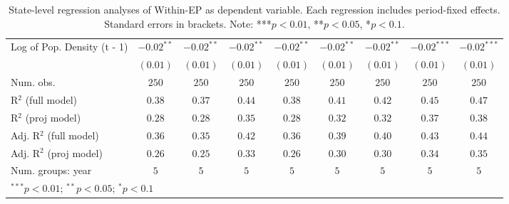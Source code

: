 \begin{table}
\begin{center}
\begin{tabular}{l c c c c c c c c}
Log of Pop. Density (t - 1)       & $-0.02^{**}$ & $-0.02^{**}$ & $-0.02^{**}$ & $-0.02^{**}$ & $-0.02^{**}$ & $-0.02^{**}$ & $-0.02^{***}$ & $-0.02^{***}$ \\
                                  & $(0.01)$     & $(0.01)$     & $(0.01)$     & $(0.01)$     & $(0.01)$     & $(0.01)$     & $(0.01)$      & $(0.01)$      \\
\hline
Num. obs.                         & $250$        & $250$        & $250$        & $250$        & $250$        & $250$        & $250$         & $250$         \\
R$^2$ (full model)                & $0.38$       & $0.37$       & $0.44$       & $0.38$       & $0.41$       & $0.42$       & $0.45$        & $0.47$        \\
R$^2$ (proj model)                & $0.28$       & $0.28$       & $0.35$       & $0.28$       & $0.32$       & $0.32$       & $0.37$        & $0.38$        \\
Adj. R$^2$ (full model)           & $0.36$       & $0.35$       & $0.42$       & $0.36$       & $0.39$       & $0.40$       & $0.43$        & $0.44$        \\
Adj. R$^2$ (proj model)           & $0.26$       & $0.25$       & $0.33$       & $0.26$       & $0.30$       & $0.30$       & $0.34$        & $0.35$        \\
Num. groups: year                 & $5$          & $5$          & $5$          & $5$          & $5$          & $5$          & $5$           & $5$           \\
\hline
\multicolumn{9}{l}{\scriptsize{$^{***}p<0.01$; $^{**}p<0.05$; $^{*}p<0.1$}}
\end{tabular}
\caption{State-level regression analyses of Within-EP as dependent variable. Each regression includes period-fixed effects. Standard errors in brackets. Note: ***$p<0.01$, **$p<0.05$, *$p<0.1$.}
\label{tab:within_epi_3}
\end{center}
\end{table}

